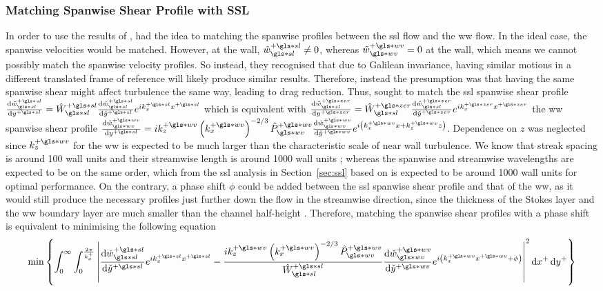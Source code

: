 \subsubsection{Matching Spanwise Shear Profile with SSL}
In order to use the results of \textcite{viotti2009}, \textcite{chernyshenko2013} had the idea to matching the spanwise profiles between the \gls*{ssl} flow and the \gls*{ww} flow. In the ideal case, the spanwise velocities would be matched. However, at the wall, $\tilde{w}\ps\ssl\neq0$, whereas $\tilde{w}\pw\ww=0$ at the wall, which means we cannot possibly match the spanwise velocity profiles. So instead, they recognised that due to Galilean invariance, having similar motions in a different translated frame of reference will likely produce similar results. Therefore, instead the presumption was that having the same spanwise shear might affect turbulence the same way, leading to drag reduction. Thus, \textcite{chernyshenko2013} sought to match the \gls*{ssl} spanwise shear profile $\dv{\tilde{w}\ps\ssl}{y\ps} =\hat{W}\ps\ssl\dv{\check{w}\ps\ssl}{\check{y}\ps} e^{ik_x\ps x\ps}$ which is equivalent with
$\dv{\tilde{w}\pz\ssl}{y\pz} =\hat{W}\pz\ssl\dv{\check{w}\pz\ssl}{\check{y}\pz} e^{ik_x\pz x\pz}$
the \gls*{ww} spanwise shear profile $\dv{\tilde{w}\pw\ww}{y\ps}=ik_z\pw \left( k_x\pw \right) ^{-2 /3} \hat{P}\pw\ww \dv{\check{w}\pw\ww}{\check{y}\pw}  e^{i\left( k_x\pw x+k_z \pw z \right) }$. %
Dependence on $z$ was neglected since $k_z\pw$ for the  \gls*{ww} is expected to be much larger than the characteristic scale of near wall turbulence. We know that streak spacing is around 100 wall units and their streamwise length is around 1000 wall units \cite{chernyshenko2005}; whereas the spanwise and streamwise wavelengths are expected to be on the same order, which from the \gls*{ssl} analysis in Section~\ref{sec:ssl} based on \textcite{viotti2009} is expected to be around 1000 wall units for optimal performance. On the contrary, a phase shift $\phi $ could be added between the \gls*{ssl} spanwise shear profile and that of the \gls*{ww}, as it would still produce the necessary profiles just further down the flow in the streamwise direction, since the thickness of the Stokes layer and the \gls*{ww} boundary layer are much smaller than the channel half-height \cite{ghebali2017}. Therefore, matching the spanwise shear profiles with a phase shift is equivalent to minimising the following equation
\begin{equation}
	\min \left\{ \int_{0}^{\infty} \int_{0}^{\frac{2\pi}{k_x^{+}}} \left| \dv{\check{w}\ps\ssl}{\check{y}\ps} e^{ik_x\ps x\ps} - \frac{ik_z\pw \left( k_x\pw \right) ^{-2 /3}\hat{P}\pw\ww }{\hat{W}\ps\ssl} \dv{\check{w}\pw\ww}{\check{y}\pw}  e^{i\left(k_x\pw x\pw+\phi \right)} \right|^2 \dd{x^{+}} \dd{y^{+}}  \right\}\label{eq:minshear}
\end{equation}
